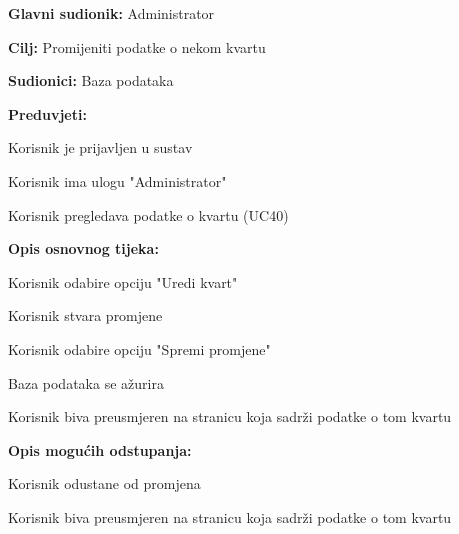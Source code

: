					\noindent {}
					\begin{packed_item}
	
						\item \textbf{Glavni sudionik: }Administrator
						\item  \textbf{Cilj:} Promijeniti podatke o nekom kvartu
						\item  \textbf{Sudionici:} Baza podataka
						\item  \textbf{Preduvjeti:}
						\item[] \begin{packed_enum}
							\item Korisnik je prijavljen u sustav
							\item Korisnik ima ulogu "Administrator"
							\item Korisnik pregledava podatke o kvartu (UC40)
						\end{packed_enum}
						\item  \textbf{Opis osnovnog tijeka:}
						
						\item[] \begin{packed_enum}
	
							\item Korisnik odabire opciju "Uredi kvart"
							\item Korisnik stvara promjene
							\item Korisnik odabire opciju "Spremi promjene"
							\item Baza podataka se ažurira
							\item Korisnik biva preusmjeren na stranicu koja sadrži podatke o tom kvartu
						\end{packed_enum}
						
						\item  \textbf{Opis mogućih odstupanja:}
						
						\item[] \begin{packed_item}
	
							\item[3.a] Korisnik odustane od promjena
							\item[] \begin{packed_enum}
								
								\item Korisnik biva preusmjeren na stranicu koja sadrži podatke o tom kvartu
								
							\end{packed_enum}
							

\end{packed_item}
\end{packed_item}
